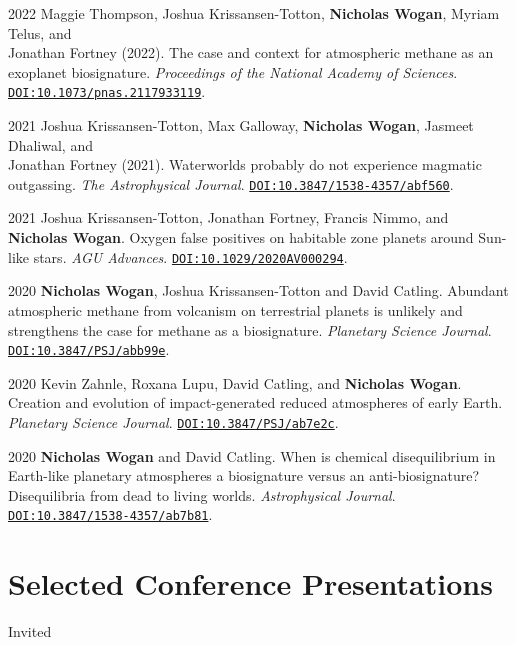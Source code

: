 \documentclass{article}
\begin{document}
\begin{cvlist}
\item[2022]
  Maggie Thompson, Joshua Krissansen-Totton, \textbf{Nicholas Wogan}, Myriam Telus, and \\Jonathan Fortney (2022). The case and context for atmospheric methane as an exoplanet biosignature. \emph{Proceedings of the National Academy of Sciences}. \href{https://doi.org/10.1073/pnas.2117933119}{\nolinkurl{DOI:10.1073/pnas.2117933119}}.
\item[2021]
  Joshua Krissansen-Totton, Max Galloway, \textbf{Nicholas Wogan}, Jasmeet Dhaliwal, and \\Jonathan Fortney (2021). Waterworlds probably do not experience magmatic outgassing. \emph{The Astrophysical Journal}. \href{https://doi.org/10.3847/1538-4357/abf560}{\nolinkurl{DOI:10.3847/1538-4357/abf560}}.
\item[2021]
  Joshua Krissansen-Totton, Jonathan Fortney, Francis Nimmo, and \textbf{Nicholas Wogan}. Oxygen false positives on habitable zone planets around Sun-like stars. \emph{AGU Advances}. \href{https://doi.org/10.1029/2020AV000294}{\nolinkurl{DOI:10.1029/2020AV000294}}.
\item[2020]
  \textbf{Nicholas Wogan}, Joshua Krissansen-Totton and David Catling. Abundant atmospheric methane from volcanism on terrestrial planets is unlikely and strengthens the case for methane as a biosignature. \emph{Planetary Science Journal}. \href{https://doi.org/10.3847/PSJ/abb99e}{\nolinkurl{DOI:10.3847/PSJ/abb99e}}.
\item[2020]
  Kevin Zahnle, Roxana Lupu, David Catling, and \textbf{Nicholas Wogan}. Creation and evolution of impact-generated reduced atmospheres of early Earth. \emph{Planetary Science Journal}. \href{https://doi.org/10.3847/PSJ/ab7e2c}{\nolinkurl{DOI:10.3847/PSJ/ab7e2c}}.
\item[2020]
  \textbf{Nicholas Wogan} and David Catling. When is chemical disequilibrium in Earth-like planetary atmospheres a biosignature versus an anti-biosignature? Disequilibria from dead to living worlds. \emph{Astrophysical Journal}. \href{https://doi.org/10.3847/1538-4357/ab7b81}{\nolinkurl{DOI:10.3847/1538-4357/ab7b81}}.
\end{cvlist}

\section{Selected Conference Presentations}

\noindent Invited
\end{document}
